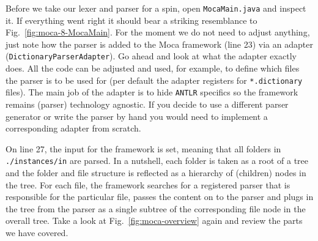 Before we take our lexer and parser for a spin, open \texttt{MocaMain.java} and inspect it.
If everything went right it should bear a striking resemblance to Fig.~\ref{fig:moca-8-MocaMain}.
For the moment we do not need to adjust anything, just note how the parser is added to the Moca framework (line 23) via an adapter (\texttt{Dictionary\-Parser\-Adapter}).
Go ahead and look at what the adapter exactly does.
All the code can be adjusted and used, for example, to define which files the parser is to be used for (per default the adapter registers for \texttt{*.dictionary} files).
The main job of the adapter is to hide \texttt{ANTLR} specifics so the framework remains (parser) technology agnostic.
If you decide to use a different parser generator or write the parser by hand you would need to implement a corresponding adapter from scratch.

On line 27, the input for the framework is set, meaning that all folders in \texttt{./instances/in} are parsed.
In a nutshell, each folder is taken as a root of a tree and the folder and file structure is reflected as a hierarchy of (children) nodes in the tree.
For each file, the framework searches for a registered parser that is responsible for the particular file, passes the content on to the parser and plugs in the tree from the parser as a single subtree of the corresponding file node in the overall tree.  Take a look at Fig.~\ref{fig:moca-overview} again and review the parts we have covered.

